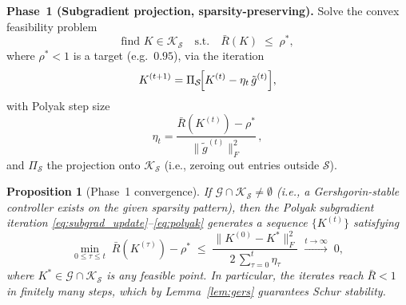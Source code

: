 \documentclass[conference]{IEEEtran}
\newtheorem{proposition}{Proposition}
\begin{document}
\medskip\noindent
\textbf{Phase~1 (Subgradient projection, sparsity-preserving).}
Solve the convex feasibility problem
\begin{equation}\label{eq:feasibility}
  \text{find } K\in\mathcal{K}_{\mathcal{S}} \quad
  \text{s.t.}\quad \bar{R}(K) \;\le\; \rho^*,
\end{equation}
where $\rho^*<1$ is a target (e.g.\ $0.95$), via the iteration
\begin{equation}\label{eq:subgrad_update}
  K^{(t+1)} = \Pi_{\mathcal{S}}\!\Bigl[
    K^{(t)} - \eta_t\,\tilde{g}^{(t)}
  \Bigr],
\end{equation}
with Polyak step size
\begin{equation}\label{eq:polyak}
  \eta_t = \frac{\bar{R}(K^{(t)})-\rho^*}
               {\|\tilde{g}^{(t)}\|_F^2}\,,
\end{equation}
and $\Pi_{\mathcal{S}}$ the projection onto
$\mathcal{K}_{\mathcal{S}}$ (i.e., zeroing out entries outside
$\mathcal{S}$).

\begin{proposition}[Phase~1 convergence]\label{prop:phase1_conv}
If $\mathcal{G}\cap\mathcal{K}_{\mathcal{S}}\neq\emptyset$
(i.e., a Gershgorin-stable controller exists on the given sparsity
pattern), then the Polyak subgradient iteration
\eqref{eq:subgrad_update}--\eqref{eq:polyak} generates a sequence
$\{K^{(t)}\}$ satisfying
\begin{equation}\label{eq:phase1_rate}
  \min_{0\le\tau\le t}\; \bar{R}(K^{(\tau)}) - \rho^*
  \;\le\;
  \frac{\|K^{(0)}-K^*\|_F^2}{2\,\sum_{\tau=0}^{t}\eta_\tau}
  \;\xrightarrow{t\to\infty}\; 0,
\end{equation}
where $K^*\in\mathcal{G}\cap\mathcal{K}_{\mathcal{S}}$ is any
feasible point.  In particular, the iterates reach $\bar{R}<1$ in
finitely many steps, which by Lemma~\ref{lem:gers} guarantees Schur
stability.
\end{proposition}
\end{document}
